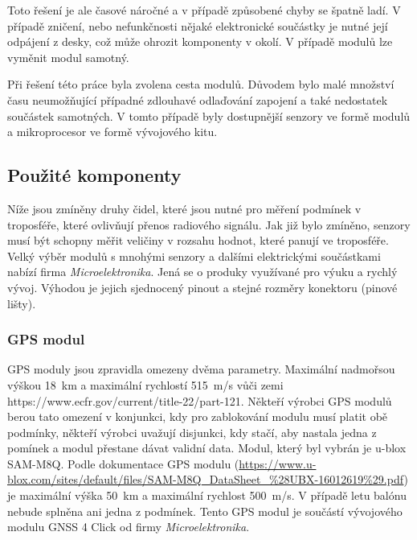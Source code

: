 \documentclass[twoside]{ctuthesis}
\theoremstyle{plain}
\theoremstyle{definition}
\theoremstyle{note}
\begin{document}
		Toto řešení je ale časové náročné a v případě způsobené chyby se špatně ladí. V případě zničení, nebo nefunkčnosti nějaké elektronické součástky je nutné její odpájení z desky, což může ohrozit komponenty v okolí. V případě modulů lze vyměnit modul samotný.

		Při řešení této práce byla zvolena cesta modulů. Důvodem bylo malé množství času neumožňující případné zdlouhavé odlaďování zapojení a také nedostatek součástek samotných. V tomto případě byly dostupnější senzory ve formě modulů a mikroprocesor ve formě vývojového kitu. 

		\subsection{Použité komponenty}
		Níže jsou zmíněny druhy čidel, které jsou nutné pro měření podmínek v troposféře, které ovlivňují přenos radiového signálu. Jak již bylo zmíněno, senzory musí být schopny měřit veličiny v rozsahu hodnot, které panují ve troposféře. Velký výběr modulů s mnohými senzory a dalšími elektrickými součástkami nabízí firma \textit{Microelektronika}. Jená se o produky využívané pro výuku a rychlý vývoj. Výhodou je jejich sjednocený pinout a stejné rozměry konektoru (pinové lišty).

		\subsubsection{GPS modul}
		GPS moduly jsou zpravidla omezeny dvěma parametry. Maximální nadmořsou výškou 18~km a maximální rychlostí 515~m/s vůči zemi https://www.ecfr.gov/current/title-22/part-121. Někteří výrobci GPS modulů berou tato omezení v konjunkci, kdy pro zablokování modulu musí platit obě podmínky, někteří výrobci uvažují  disjunkci, kdy stačí, aby nastala jedna z pomínek a modul přestane dávat validní data. Modul, který byl vybrán je u-blox SAM-M8Q. Podle dokumentace GPS modulu (\url{https://www.u-blox.com/sites/default/files/SAM-M8Q_DataSheet_%28UBX-16012619%29.pdf}) je maximální výška 50~km a maximální rychlost 500~m/s. V případě letu balónu nebude splněna ani jedna z podmínek. Tento GPS modul je součástí vývojového modulu GNSS 4 Click od firmy \textit{Microelektronika}.
\end{document}
